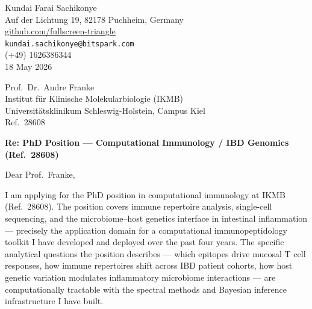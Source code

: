 \documentclass[12pt,a4paper]{article}
\begin{document}
\begin{flushright}
Kundai Farai Sachikonye \\
Auf der Lichtung 19, 82178 Puchheim, Germany \\
\href{https://github.com/fullscreen-triangle}{github.com/fullscreen-triangle} \\
\texttt{kundai.sachikonye@bitspark.com} \\
(+49) 1626386344 \\[6pt]
18 May 2026
\end{flushright}

\vspace{1em}

Prof.\ Dr.\ Andre Franke \\
Institut für Klinische Molekularbiologie (IKMB) \\
Universitätsklinikum Schleswig-Holstein, Campus Kiel \\
Ref.\ 28608

\vspace{1.5em}

\textbf{Re: PhD Position --- Computational Immunology / IBD Genomics (Ref.\ 28608)}

\vspace{1em}

Dear Prof.\ Franke,

I am applying for the PhD position in computational immunology at IKMB (Ref.\ 28608).
The position covers immune repertoire analysis, single-cell sequencing, and the
microbiome--host genetics interface in intestinal inflammation --- precisely the
application domain for a computational immunopeptidology toolkit I have developed
and deployed over the past four years.
The specific analytical questions the position describes --- which epitopes drive
mucosal T cell responses, how immune repertoires shift across IBD patient cohorts,
how host genetic variation modulates inflammatory microbiome interactions ---
are computationally tractable with the spectral methods and Bayesian inference
infrastructure I have built.
\end{document}
